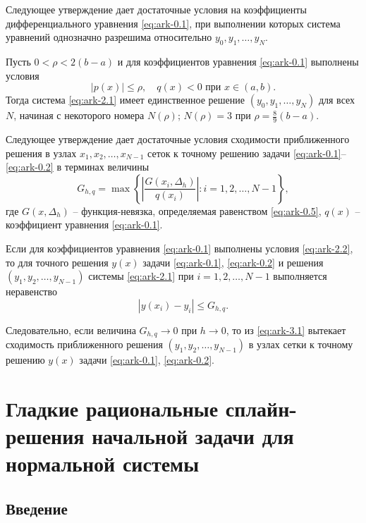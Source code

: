 Следующее утверждение дает достаточные условия на коэффициенты дифференциального
уравнения \eqref{eq:ark-0.1},
при выполнении которых система уравнений однозначно разрешима относительно
$y_0,y_1,\dots,y_N$.

\begin{theorem}\label{th:ark-theo2}
Пусть $0<\rho<2(b-a)$ и для коэффициентов уравнения \eqref{eq:ark-0.1} выполнены условия
\begin{equation}\label{eq:ark-2.2}
|p(x)|\leqslant \rho,\quad q(x)<0 \text{ при } x\in (a,b).
\end{equation}
Тогда система \eqref{eq:ark-2.1} имеет единственное решение $(y_0,y_1,\dots,y_N)$ для
всех $N$, начиная с некоторого номера $N(\rho)$; $N(\rho)=3$ при $\rho=\frac 89 (b-a)$.
\end{theorem}

Следующее утверждение дает достаточные условия сходимости приближенного решения
в узлах $x_1,x_2, \dots,x_{N-1}$ сеток к точному решению задачи \eqref{eq:ark-0.1}--\eqref{eq:ark-0.2}
в терминах величины
$$
G_{h,q}=\max\left\{\left|\frac{G(x_i,\Delta_h)}{q(x_i)}\right|: i=1,2,\dots,N-1\right\},
$$
где $G(x,\Delta_h)$ -- функция-невязка, определяемая равенством \eqref{eq:ark-0.5}, $q(x)$ --
коэффициент уравнения \eqref{eq:ark-0.1}.

\begin{theorem} \label{th:ark-theo3}
Если для коэффициентов уравнения \eqref{eq:ark-0.1} выполнены условия \eqref{eq:ark-2.2}, то для
точного решения $y(x)$ задачи \eqref{eq:ark-0.1}, \eqref{eq:ark-0.2} и решения $(y_1,y_2,\dots,y_{N-1})$
системы \eqref{eq:ark-2.1} при $i=1,2,\dots,N-1$ выполняется неравенство
\begin{equation}\label{eq:ark-3.1}
|y(x_i)-y_i|\leqslant G_{h,q}.
\end{equation}
\end{theorem}

Следовательно, если величина $G_{h,q}\to 0$ при $h\to 0$, то из \eqref{eq:ark-3.1} вытекает сходимость
приближенного решения $(y_1,y_2,\dots,y_{N-1})$ в узлах сетки к точному решению
$y(x)$ задачи \eqref{eq:ark-0.1}, \eqref{eq:ark-0.2}.


\section{Гладкие рациональные сплайн-решения начальной задачи для нормальной системы}

\subsection{Введение}

